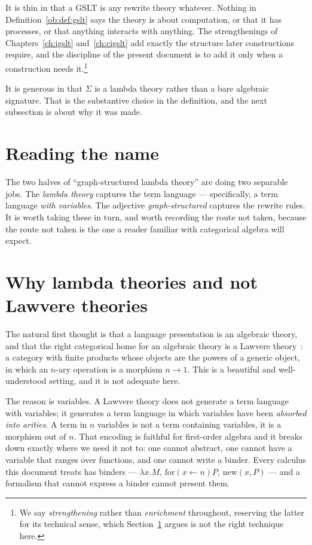 It is thin in that a GSLT is any rewrite theory whatever. Nothing in
Definition~\ref{ob:def:gslt} says the theory is about computation, or that it has processes,
or that anything interacts with anything. The strengthenings of
Chapters~\ref{ch:igslt} and~\ref{ch:cigslt} add exactly the structure later
constructions require, and the discipline of the present document is to add it only when
a construction needs it.\footnote{We say \emph{strengthening} rather than
\emph{enrichment} throughout, reserving the latter for its technical sense, which
Section~\ref{ob:subsec:name} argues is not the right technique here.}

It is generous in that $\Sigma$ is a lambda theory rather than a bare algebraic
signature. That is the substantive choice in the definition, and the next subsection is
about why it was made.

\section{Reading the name}
\label{ob:subsec:name}

The two halves of ``graph-structured lambda theory'' are doing two separable jobs. The
\emph{lambda theory} captures the term language --- specifically, a term language
\emph{with variables}. The adjective \emph{graph-structured} captures the rewrite rules.
It is worth taking these in turn, and worth recording the route not taken, because the
route not taken is the one a reader familiar with categorical algebra will expect.

\section{Why lambda theories and not Lawvere theories}

The natural first thought is that a language presentation is an algebraic theory, and
that the right categorical home for an algebraic theory is a Lawvere
theory~\cite{Lawvere1963}: a category with finite products whose objects are the powers
of a generic object, in which an $n$-ary operation is a morphism $n \to 1$. This is a
beautiful and well-understood setting, and it is not adequate here.

The reason is variables. A Lawvere theory does not generate a term language with
variables; it generates a term language in which variables have been \emph{absorbed into
arities}. A term in $n$ variables is not a term containing variables, it is a morphism
out of $n$. That encoding is faithful for first-order algebra and it breaks down exactly
where we need it not to: one cannot abstract, one cannot have a variable that ranges over
functions, and one cannot write a binder. Every calculus this document treats has
binders --- $\lambda x.M$, $\mathrm{for}(x \leftarrow n)P$, $\mathrm{new}(x, P)$ --- and
a formalism that cannot express a binder cannot present them.

